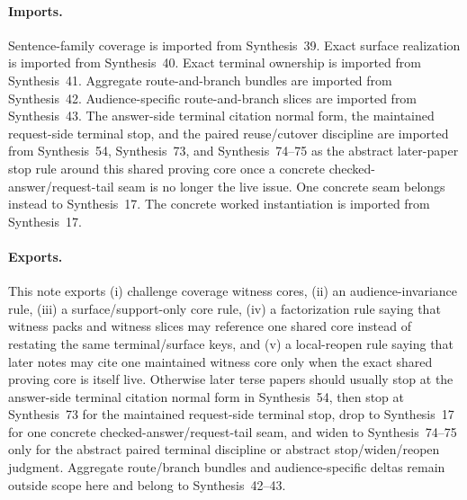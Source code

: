 \documentclass[11pt]{article}
\begin{document}
\paragraph{Imports.}
Sentence-family coverage is imported from Synthesis~39.\cite{series:challengecoverage}
Exact surface realization is imported from Synthesis~40.\cite{series:challengesurfacehooks}
Exact terminal ownership is imported from Synthesis~41.\cite{series:challengeterminalwitnesses}
Aggregate route-and-branch bundles are imported from Synthesis~42.\cite{series:challengecoveragewitnesspacks}
Audience-specific route-and-branch slices are imported from Synthesis~43.\cite{series:challengecoveragewitnessslices}
The answer-side terminal citation normal form, the maintained request-side terminal stop, and the paired reuse/cutover discipline are imported from Synthesis~54, Synthesis~73, and Synthesis~74--75 as the abstract later-paper stop rule around this shared proving core once a concrete checked-answer/request-tail seam is no longer the live issue. One concrete seam belongs instead to Synthesis~17.\cite{series:challengeanswerreviewmenus,series:publicrequestresponsepacketrefreshresponsepacketclosureverdicts,series:pairedterminalcitationdiscipline,series:pairedterminalcutoverrules,series:workedexample}
The concrete worked instantiation is imported from Synthesis~17.\cite{series:workedexample}
\paragraph{Exports.}
This note exports (i) challenge coverage witness cores, (ii) an audience-invariance rule, (iii) a surface/support-only core rule, (iv) a factorization rule saying that witness packs and witness slices may reference one shared core instead of restating the same terminal/surface keys, and (v) a local-reopen rule saying that later notes may cite one maintained witness core only when the exact shared proving core is itself live.
Otherwise later terse papers should usually stop at the answer-side terminal citation normal form in Synthesis~54, then stop at Synthesis~73 for the maintained request-side terminal stop, drop to Synthesis~17 for one concrete checked-answer/request-tail seam, and widen to Synthesis~74--75 only for the abstract paired terminal discipline or abstract stop/widen/reopen judgment. Aggregate route/branch bundles and audience-specific deltas remain outside scope here and belong to Synthesis~42--43.\cite{series:challengecoveragewitnesspacks,series:challengecoveragewitnessslices,series:challengeanswerreviewmenus,series:publicrequestresponsepacketrefreshresponsepacketclosureverdicts,series:pairedterminalcitationdiscipline,series:pairedterminalcutoverrules,series:workedexample}
\end{document}
